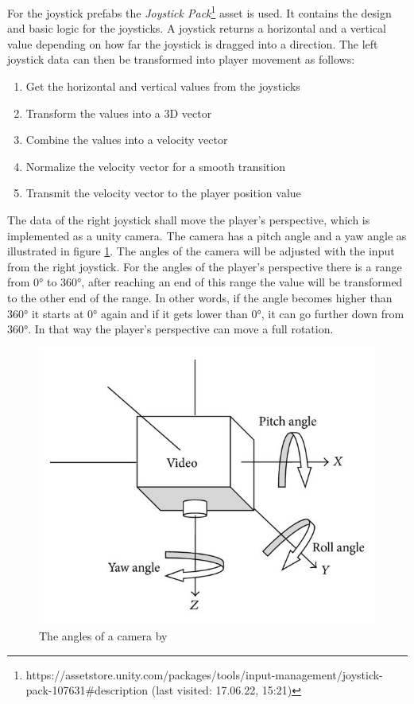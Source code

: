 For the joystick \glspl{prefab} the \textit{Joystick Pack}\footnote{https://assetstore.unity.com/packages/tools/input-management/joystick-pack-107631\#description (last visited: 17.06.22, 15:21)} \gls{asset} is used.
It contains the design and basic logic for the joysticks.
A joystick returns a horizontal and a vertical value depending on how far the joystick is dragged into a direction.
The left joystick data can then be transformed into player movement as follows:
\begin{enumerate}
    \item Get the horizontal and vertical values from the joysticks
    \item Transform the values into a 3D vector
    \item Combine the values into a velocity vector
    \item Normalize the velocity vector for a smooth transition
    \item Transmit the velocity vector to the player position value
\end{enumerate}

The data of the right joystick shall move the player's perspective, which is implemented as a \gls{unity} camera.
The camera has a pitch angle and a yaw angle as illustrated in figure \ref{fig:camera}.
The angles of the camera will be adjusted with the input from the right joystick. 
For the angles of the player's perspective there is a range from 0° to 360°, after reaching an end of this range the value will be transformed to the other end of the range.
In other words, if the angle becomes higher than 360° it starts at 0° again and if it gets lower than 0°, it can go further down from 360°.
In that way the player's perspective can move a full rotation.
\begin{figure}[htb]
    \centering
    \includegraphics[width=1\textwidth]{Implementation/img/pitch_yaw.jpg}
    \caption{The angles of a camera by \cite{Zhang2014}}\label{fig:camera}
\end{figure}


